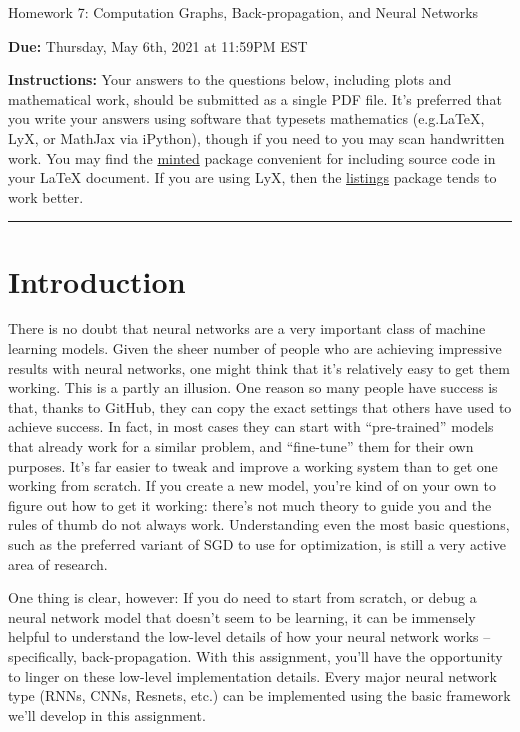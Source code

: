 \documentclass{article}
\newcommand{\ruleskip}{\bigskip\hrule\bigskip}
\theoremstyle{plain}
\theoremstyle{definition}
\begin{document}

\pagestyle{myheadings} 

\begin{center}
{\Large
Homework 7: Computation Graphs, Back-propagation, and Neural Networks
} 
\end{center}

{
{ \color{nyupurple} \textbf{Due:} Thursday, May 6th, 2021 at 11:59PM EST} 
} 

\textbf{Instructions: }Your answers to the questions below, including plots and mathematical work, should be submitted as a single PDF file.  It's preferred that you write your answers using software that typesets mathematics (e.g.LaTeX, LyX, or MathJax via iPython), though if you need to you may scan handwritten work.  You may find the \href{https://github.com/gpoore/minted}{minted} package convenient for including source code in your LaTeX document.  If you are using LyX, then the \href{https://en.wikibooks.org/wiki/LaTeX/Source_Code_Listings}{listings} package tends to work better. 

\ruleskip

\section{Introduction}

There is no doubt that neural networks are a very important class
of machine learning models. Given the sheer number of people who are
achieving impressive results with neural networks, one might think
that it's relatively easy to get them working. This is a partly an
illusion. One reason so many people have success is that, thanks to
GitHub, they can copy the exact settings that others have used to
achieve success. In fact, in most cases they can start with ``pre-trained''
models that already work for a similar problem, and ``fine-tune''
them for their own purposes. It's far easier to tweak and improve
a working system than to get one working from scratch. If you create
a new model, you're kind of on your own to figure out how to get it
working: there's not much theory to guide you and the rules of thumb
do not always work. Understanding even the most basic questions, such
as the preferred variant of SGD to use for optimization, is still
a very active area of research.

One thing is clear, however: If you do need to start from scratch,
or debug a neural network model that doesn't seem to be learning,
it can be immensely helpful to understand the low-level details of
how your neural network works -- specifically, back-propagation.
With this assignment, you'll have the opportunity to linger on these
low-level implementation details. Every major neural network type
(RNNs, CNNs, Resnets, etc.) can be implemented using the basic framework
we'll develop in this assignment.
\end{document}
